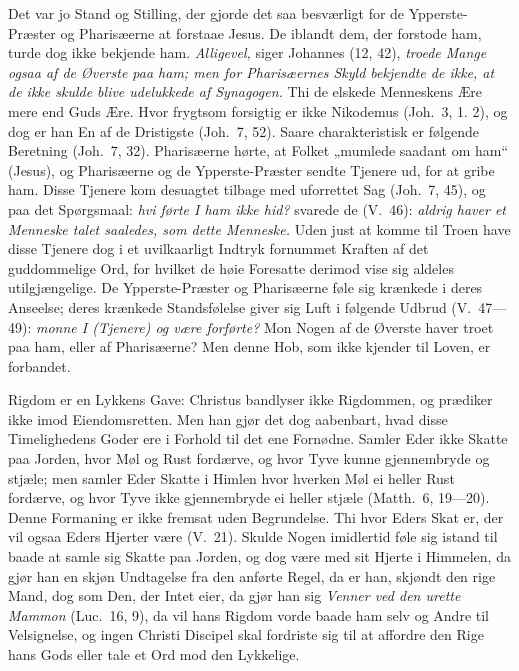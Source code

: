 \documentclass[12pt,a4paper]{book}
\begin{document}
Det var jo Stand og Stilling, der gjorde det saa besværligt for de Ypperste-Præster og
Pharisæerne at forstaae Jesus. De iblandt dem, der forstode ham, turde dog ikke bekjende
ham. \emph{Alligevel,} siger Johannes (12, 42), \emph{troede Mange ogsaa af de Øverste paa
ham; men for Pharisæernes Skyld bekjendte de ikke, at de ikke skulde blive udelukkede af
Synagogen.} {\large Thi de elskede Menneskens Ære mere end Guds Ære.} Hvor frygtsom
forsigtig er ikke Nikodemus (Joh.\ 3, 1. 2), og dog er han En af de Dristigste (Joh.\ 7,
52). Saare charakteristisk er følgende Beretning (Joh.\ 7, 32). Pharisæerne hørte, at
Folket „mumlede saadant om ham“ (Jesus), og Pharisæerne og de Ypperste-Præster sendte
Tjenere ud, for at gribe ham. Disse Tjenere kom desuagtet tilbage med uforrettet Sag
(Joh.\ 7, 45), og paa det Spørgsmaal: \emph{hvi førte I ham ikke hid?} svarede de (V.\
46): \emph{aldrig haver et Menneske talet saaledes, som dette Menneske.} Uden just at
komme til Troen have disse Tjenere dog i et uvilkaarligt Indtryk fornummet Kraften af det
guddommelige Ord, for hvilket de høie Foresatte derimod vise sig aldeles utilgjængelige.
De Ypperste-Præster og Pharisæerne føle sig krænkede i deres Anseelse; deres krænkede
Standsfølelse giver sig Luft i følgende Udbrud (V.\ 47---49): \emph{monne I (Tjenere) og
være forførte?} {\large Mon Nogen af de Øverste haver troet paa ham, eller af
Pharisæerne? Men denne Hob, som ikke kjender til Loven, er forbandet.}

Rigdom er en Lykkens Gave: Christus bandlyser ikke Rigdommen, og prædiker ikke imod
Eiendomsretten. Men han gjør det dog aabenbart, hvad disse Timelighedens Goder ere i
Forhold til det ene Fornødne. {\large Samler Eder ikke Skatte paa Jorden, hvor Møl og Rust
fordærve, og hvor Tyve kunne gjennembryde og stjæle; men samler Eder Skatte i Himlen hvor
hverken Møl ei heller Rust fordærve, og hvor Tyve ikke gjennembryde ei heller stjæle
(Matth.\ 6, 19---20).} Denne Formaning er ikke fremsat uden Begrundelse. {\large Thi hvor
Eders Skat er, der vil ogsaa Eders Hjerter være (V.\ 21).} Skulde Nogen imidlertid føle
sig istand til baade at samle sig Skatte paa Jorden, og dog være med sit Hjerte i
Himmelen, da gjør han en skjøn Undtagelse fra den anførte Regel, da er han, skjøndt den
rige Mand, dog som Den, der Intet eier, da gjør han sig \emph{Venner ved den urette
Mammon} (Luc.\ 16, 9), da vil hans Rigdom vorde baade ham selv og Andre til Velsignelse,
og ingen Christi Discipel skal fordriste sig til at affordre den Rige hans Gods eller tale
et Ord mod den Lykkelige.
\end{document}

